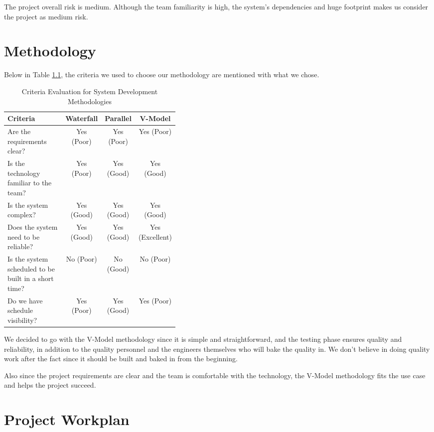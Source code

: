\documentclass[a4paper]{report}
\begin{document}
The project overall risk is medium. Although the team familiarity is high, the system's dependencies and huge footprint makes us consider the project as medium risk.

\chapter{Methodology}

Below in Table \ref{tab:methodology-criteria}, the criteria we used to choose our methodology are mentioned with what we chose. 

\begin{table}[htbp]
    \centering
    \caption{Criteria Evaluation for System Development Methodologies}
    \label{tab:methodology-criteria}
    \begin{tabular}{@{}p{0.4\linewidth}ccc@{}}
        \toprule
        Criteria & Waterfall & Parallel & V-Model \\
        \midrule
        Are the requirements clear? & Yes (Poor) & Yes (Poor) & Yes (Poor) \\
        Is the technology familiar to the team? & Yes (Poor) & Yes (Good) & Yes (Good) \\
        Is the system complex? & Yes (Good) & Yes (Good) & Yes (Good) \\
        Does the system need to be reliable? & Yes (Good) & Yes (Good) & Yes (Excellent) \\
        Is the system scheduled to be built in a short time? & No (Poor) & No (Good) & No (Poor) \\
        Do we have schedule visibility? & Yes (Poor) & Yes (Good) & Yes (Poor) \\
        \bottomrule
    \end{tabular}
\end{table}

We decided to go with the V-Model methodology since it is simple and straightforward, and the testing phase ensures quality and reliability, in addition to the quality personnel and the engineers themselves who will bake the quality in. We don't believe in doing quality work after the fact since it should be built and baked in from the beginning.

Also since the project requirements are clear and the team is comfortable with the technology, the V-Model methodology fits the use case and helps the project succeed.

\chapter{Project Workplan}
\end{document}
